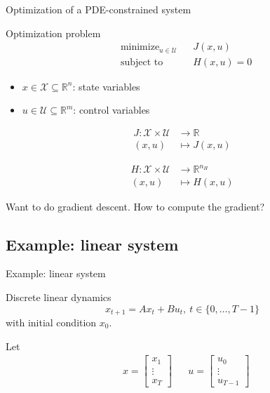 \documentclass[xcolor=svgnames, english, smaller]{beamer}
\theoremstyle{plain}
\theoremstyle{definition}
\theoremstyle{plain}
\theoremstyle{plain}
\newcommand \Rbb{\mathbb{R}}
\newcommand \Ucal{\mathcal{U}}
\newcommand \Xcal{\mathcal{X}}
\begin{document}
\begin{frame}{Optimization of a PDE-constrained system}

\begin{block}{Optimization problem}
\[
\begin{aligned}
&\text{minimize}_{u \in \Ucal} && J(x,u) \\
&\text{subject to} &&H(x,u) = 0
\end{aligned}
\]
\end{block}

\begin{itemize}
\item $x \in \Xcal \subseteq \Rbb^n$: state variables
\item $u \in \Ucal  \subseteq \Rbb^m$: control variables
\end{itemize}


\[
\begin{aligned}
J: \Xcal \times \Ucal & \rightarrow \mathbb{R}\\
(x,u) & \mapsto J(x,u)
\end{aligned}
\]

\[
\begin{aligned}
H: \Xcal \times \Ucal & \rightarrow \mathbb{R}^{n_H}\\
(x,u) & \mapsto H(x,u)
\end{aligned}
\]

Want to do gradient descent. How to compute the gradient?
\end{frame}


\subsection{Example: linear system}

\begin{frame}{Example: linear system}
\begin{block}{Discrete linear dynamics}
\[
x_{t+1} = A x_t + B u_t, \ t \in \{0, \dots, T-1 \}
\]
with initial condition $x_0$.
\end{block}

Let
\begin{align*}
& x = \left[ \begin{array}{c} x_1 \\ \vdots \\ x_T \end{array}\right] && u = \left[ \begin{array}{c} u_0 \\ \vdots \\ u_{T-1} \end{array}\right]
\end{align*}
%

\end{frame}
\end{document}
